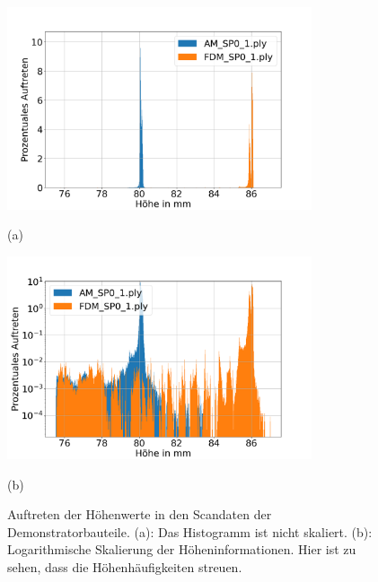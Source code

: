 \begin{figure}[H]
    \centering
    \begin{minipage}{\textwidth}
        \centering
        \includegraphics[width=0.8\textwidth]{images/height_occurange.png} %
        \caption*{(a)}
    \end{minipage}\hfill
    \begin{minipage}{\textwidth}
        \centering
        \includegraphics[width=0.8\textwidth]{images/height_occurange_log.png} %
        \caption*{(b)}
    \end{minipage}
    \caption{Auftreten der Höhenwerte in den Scandaten der Demonstratorbauteile. 
    (a): Das Histogramm ist nicht skaliert. (b): Logarithmische Skalierung der 
    Höheninformationen. Hier ist zu sehen, dass die Höhenhäufigkeiten streuen.}
    \label{fig:brightness}
\end{figure}

